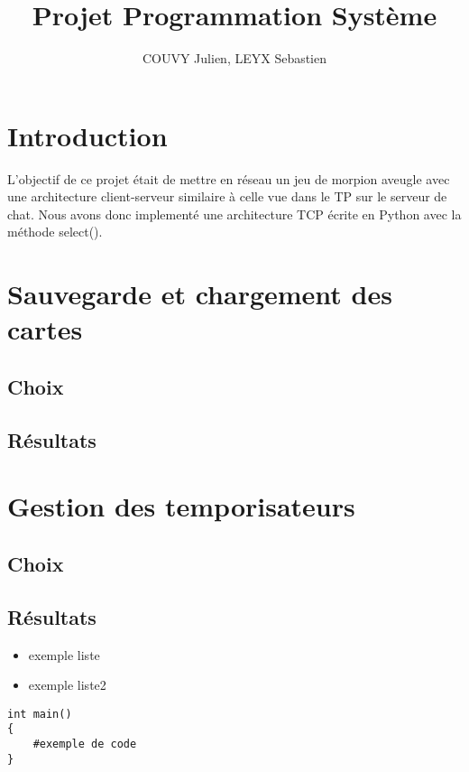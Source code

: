 \documentclass[a4paper]{article}
\title{Projet Programmation Système}
\author{COUVY Julien, LEYX Sebastien}
\begin{document}
\maketitle

\section{Introduction}
L'objectif de ce projet était de mettre en réseau un jeu de morpion aveugle avec une architecture client-serveur similaire à celle vue dans le TP sur le serveur de chat. Nous avons donc implementé une architecture TCP écrite en Python avec la méthode select().

\section{Sauvegarde et chargement des cartes}
\subsection{Choix}
\subsection{Résultats}

\section{Gestion des temporisateurs}
\subsection{Choix}
\subsection{Résultats}

\begin{itemize}
\item exemple liste
\item exemple liste2
\end{itemize}

\begin{verbatim}
int main()
{ 
	#exemple de code
}
\end{verbatim}
\end{document}
